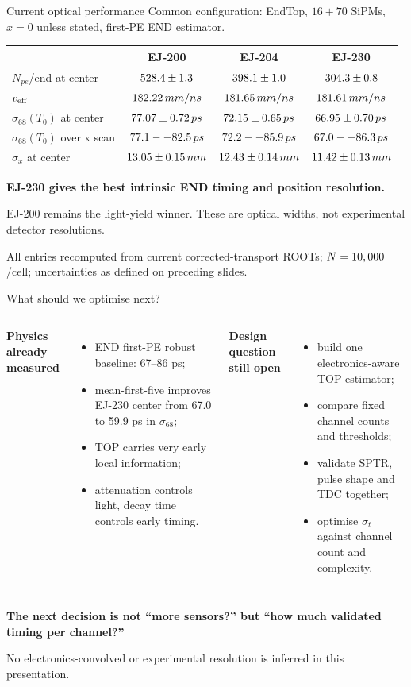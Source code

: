 \documentclass[aspectratio=169,9pt]{beamer}
\newcommand{\Source}[1]{\par\vfill{\scriptsize\color{gray}#1\par}}
\newcommand{\Result}[1]{{\Large\bfseries\color{endblue}#1}}
\begin{document}
\begin{frame}{Current optical performance}
\centering
\small Common configuration: EndTop, $16+70$ SiPMs, $x=0$ unless stated, first-PE END estimator.
\vspace{7pt}
\begin{tabular}{@{}lccc@{}}
\toprule
 & EJ-200 & EJ-204 & \textbf{EJ-230}\\
\midrule
$N_{pe}$/end at center & $528.4\pm1.3$ & $398.1\pm1.0$ & $304.3\pm0.8$\\
$v_{\rm eff}$ & $182.22\,mm/ns$ & $181.65\,mm/ns$ & $181.61\,mm/ns$\\
$\sigma_{68}(T_0)$ at center & $77.07\pm0.72\,ps$ & $72.15\pm0.65\,ps$ & \textbf{$66.95\pm0.70\,ps$}\\
$\sigma_{68}(T_0)$ over x scan & $77.1--82.5\,ps$ & $72.2--85.9\,ps$ & $67.0--86.3\,ps$\\
$\sigma_x$ at center & $13.05\pm0.15\,mm$ & $12.43\pm0.14\,mm$ & \textbf{$11.42\pm0.13\,mm$}\\
\bottomrule
\end{tabular}
\vspace{10pt}

\Result{EJ-230 gives the best intrinsic END timing and position resolution.}

EJ-200 remains the light-yield winner. These are optical widths, not experimental detector resolutions.
\Source{All entries recomputed from current corrected-transport ROOTs; $N=10,000$/cell; uncertainties as defined on preceding slides.}
\end{frame}

\begin{frame}{What should we optimise next?}
\begin{columns}[T]
\textbf{Physics already measured}
\begin{itemize}
\item END first-PE robust baseline: 67--86 ps;
\item mean-first-five improves EJ-230 center from 67.0 to 59.9 ps in $\sigma_{68}$;
\item TOP carries very early local information;
\item attenuation controls light, decay time controls early timing.
\end{itemize}
\textbf{Design question still open}
\begin{itemize}
\item build one electronics-aware TOP estimator;
\item compare fixed channel counts and thresholds;
\item validate SPTR, pulse shape and TDC together;
\item optimise $\sigma_t$ against channel count and complexity.
\end{itemize}
\end{columns}
\vspace{9pt}
\centering
\Result{The next decision is not ``more sensors?'' but ``how much validated timing per channel?''}
\Source{No electronics-convolved or experimental resolution is inferred in this presentation.}
\end{frame}

\appendix

\end{document}
